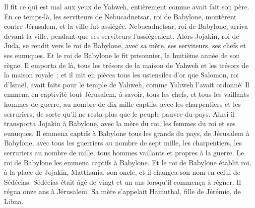 \begin{multicols}{2}
Il fit ce qui est mal aux yeux de Yahweh, entièrement comme avait fait son père.
En ce temps-là, les serviteurs de Nebucadnetsar, roi de Babylone, montèrent contre Jérusalem, et la ville fut assiégée.
Nebucadnetsar, roi de Babylone, arriva devant la ville, pendant que ses serviteurs l'assiégeaient.
Alors Jojakin, roi de Juda, se rendit vers le roi de Babylone, avec sa mère, ses serviteurs, ses chefs et ses eunuques. Et le roi de Babylone le fit prisonnier, la huitième année de son règne.
Il emporta de là, tous les trésors de la maison de Yahweh et les trésors de la maison royale~; et il mit en pièces tous les ustensiles d'or que Salomon, roi d'Israël, avait faits pour le temple de Yahweh, comme Yahweh l'avait ordonné.
Il emmena en captivité tout Jérusalem, à savoir, tous les chefs, et tous les vaillants hommes de guerre, au nombre de dix mille captifs, avec les charpentiers et les serruriers, de sorte qu'il ne resta plus que le peuple pauvre du pays.
Ainsi il transporta Jojakin à Babylone, avec la mère du roi, les femmes du roi et ses eunuques. Il emmena captifs à Babylone tous les grands du pays, de Jérusalem à Babylone,
avec tous les guerriers au nombre de sept mille, les charpentiers, les serruriers au nombre de mille, tous hommes vaillants et propres à la guerre. Le roi de Babylone les emmena captifs à Babylone.
Et le roi de Babylone établit roi, à la place de Jojakin, Matthania, son oncle, et il changea son nom en celui de Sédécias.
Sédécias était âgé de vingt et un ans lorsqu'il commença à régner. Il régna onze ans à Jérusalem. Sa mère s'appelait Hamuthal, fille de Jérémie, de Libna.

\end{multicols}
